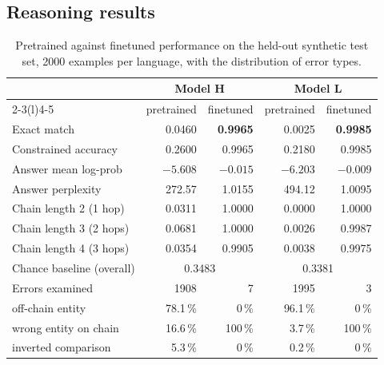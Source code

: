 \documentclass[10pt,a4paper]{article}
\newcommand{\pc}[1]{#1\,\%}
\begin{document}
\subsection{Reasoning results}

\begin{table}[htbp]
\centering\small
\caption{Pretrained against finetuned performance on the held-out synthetic test set, \num{2000} examples per language, with the distribution of error types.}
\label{tab:reason}
\begin{tabular}{@{}l r r@{\hskip 10pt} r r@{}}
\toprule
 & \multicolumn{2}{c}{\textbf{Model H}} & \multicolumn{2}{c}{\textbf{Model L}} \\
\cmidrule(r){2-3}\cmidrule(l){4-5}
 & pretrained & finetuned & pretrained & finetuned \\
\midrule
Exact match                     & 0.0460 & \textbf{0.9965} & 0.0025 & \textbf{0.9985} \\
Constrained accuracy            & 0.2600 & 0.9965 & 0.2180 & 0.9985 \\
Answer mean log-prob            & $-5.608$ & $-0.015$ & $-6.203$ & $-0.009$ \\
Answer perplexity               & 272.57 & 1.0155 & 494.12 & 1.0095 \\
\addlinespace[2pt]
Chain length 2 (1 hop)          & 0.0311 & 1.0000 & 0.0000 & 1.0000 \\
Chain length 3 (2 hops)         & 0.0681 & 1.0000 & 0.0026 & 0.9987 \\
Chain length 4 (3 hops)         & 0.0354 & 0.9905 & 0.0038 & 0.9975 \\
Chance baseline (overall)       & \multicolumn{2}{c}{0.3483} & \multicolumn{2}{c}{0.3381} \\
\addlinespace[2pt]
Errors examined                 & \num{1908} & \num{7} & \num{1995} & \num{3} \\
\quad off-chain entity          & \pc{78.1} & \pc{0} & \pc{96.1} & \pc{0} \\
\quad wrong entity on chain     & \pc{16.6} & \pc{100} & \pc{3.7} & \pc{100} \\
\quad inverted comparison       & \pc{5.3}  & \pc{0} & \pc{0.2} & \pc{0} \\
\bottomrule
\end{tabular}
\end{table}
\end{document}
